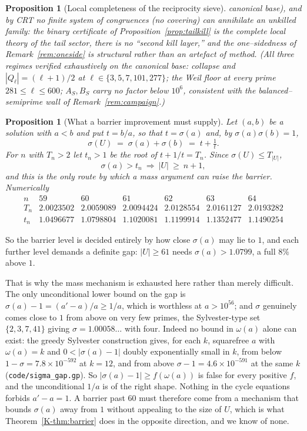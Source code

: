 \documentclass[11pt]{article}
\newtheorem{proposition}[theorem]{Proposition}
\theoremstyle{definition}
\begin{document}
\begin{proposition}[Local completeness of the reciprocity sieve]
canonical base), and by CRT \emph{no finite system of congruences (no covering) can annihilate an
unkilled family}: the binary certificate of Proposition~\ref{prop:tailkill} is the complete local theory
of the tail sector, there is no ``second kill layer,'' and the one--sidedness of
Remark~\ref{rem:oneside} is structural rather than an artefact of method. (All three regimes verified
exhaustively on the canonical base: collapse and $|Q_\ell|=(\ell+1)/2$ at
$\ell\in\{3,5,7,101,277\}$; the Weil floor at every prime $281\le\ell\le600$; $A_S,B_S$ carry no factor
below $10^6$, consistent with the balanced--semiprime wall of Remark~\ref{rem:campaign}.)
\end{proposition}

\begin{proposition}[What a barrier improvement must supply]\label{prop:barthreshold}
Let $(a,b)$ be a solution with $a<b$ and put $t=b/a$, so that $t=\sigma(a)$ and, by
$\sigma(a)\sigma(b)=1$,
\[ \sigma(U)\;=\;\sigma(a)+\sigma(b)\;=\;t+\tfrac1t. \]
For $n$ with $T_n>2$ let $t_n>1$ be the root of $t+1/t=T_n$. Since $\sigma(U)\le T_{|U|}$,
\[ \sigma(a)>t_n\ \Longrightarrow\ |U|\ \ge\ n+1, \]
and this is the only route by which a mass argument can raise the barrier. Numerically
\[
\begin{array}{l|cccccc}
n & 59 & 60 & 61 & 62 & 63 & 64\\\hline
T_n & 2.0023502 & 2.0059089 & 2.0094424 & 2.0128554 & 2.0161127 & 2.0193282\\
t_n & 1.0496677 & 1.0798804 & 1.1020081 & 1.1199914 & 1.1352477 & 1.1490254
\end{array}
\]
\end{proposition}

So the barrier level is decided entirely by how close $\sigma(a)$ may lie to $1$, and each further
level demands a definite gap: $|U|\ge61$ needs $\sigma(a)>1.0799$, a full $8\%$ above $1$.

That is why the mass mechanism is exhausted here rather than merely difficult. The only
unconditional lower bound on the gap is $\sigma(a)-1=(a'-a)/a\ge1/a$, which is worthless at
$a>10^{56}$; and $\sigma$ genuinely comes close to $1$ from above on very few primes, the
Sylvester-type set $\{2,3,7,41\}$ giving $\sigma=1.00058\ldots$ with four. Indeed no bound in
$\omega(a)$ alone can exist: the greedy Sylvester construction gives, for each $k$, squarefree $a$
with $\omega(a)=k$ and $0<|\sigma(a)-1|$ doubly exponentially small in $k$, from below
$1-\sigma=7.8\times10^{-592}$ at $k=12$, and from above $\sigma-1=4.6\times10^{-591}$ at the same
$k$ \textup{(\texttt{code/sigma\_gap.gp})}. So $|\sigma(a)-1|\ge f(\omega(a))$ is false for every
positive $f$, and the unconditional $1/a$ is of the right shape. Nothing in the cycle
equations forbids $a'-a=1$. A barrier past $60$ must therefore come from a mechanism that bounds
$\sigma(a)$ away from $1$ without appealing to the size of $U$, which is what
Theorem~\ref{K-thm:barrier} does in the opposite direction, and we know of none.
\end{document}
